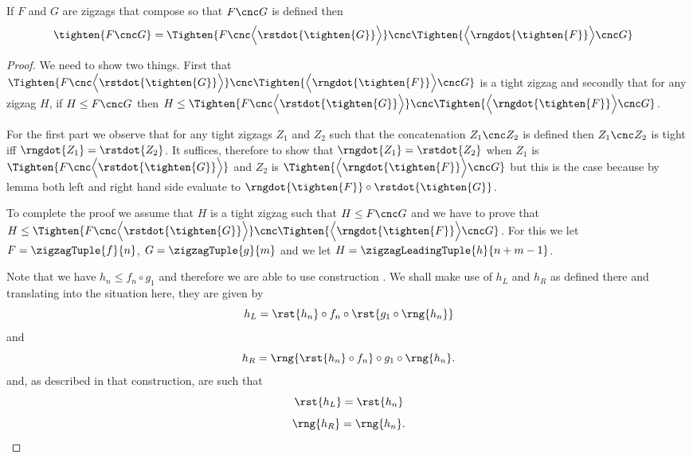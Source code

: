 {%
\newcommand{\tighteningLeft}{\Tighten{ F \cnc 
                               \Bigl\langle
                                  \rstdot{\tighten{G}}
                               \Bigr\rangle
                                      }
                            }

\newcommand {\tighteningRight}{\Tighten{ 
                                    \Bigl\langle
                                      \rngdot{\tighten{F}} 
                                    \Bigr\rangle
                                  \cnc G
                                        }
                              }
\newcommand {\theTightening}{\tighteningLeft \cnc \tighteningRight}


\begin{lemma}
If $F$ and $G$ are zigzags that compose so that
$F \cnc G$ is defined then
\begin{align*}
\tighten{F \cnc G} 
    &= \theTightening
\end{align*}
\end{lemma}
\begin{proof}
We need to show two things. First that  $\theTightening$
is a tight zigzag and secondly that for any 
zigzag $H$, if $H \leq F \cnc G$ then $H \leq \theTightening$.

For the first part we  observe that for any tight zigzags
$Z_1$ and $Z_2$ such that the concatenation $Z_1 \cnc Z_2$ is defined then $Z_1 \cnc Z_2$ is tight iff $\rngdot{Z_1} = \rstdot{Z_2}$. It suffices, therefore to show that $\rngdot{Z_1} = \rstdot{Z_2}$
when $Z_1$ is $\tighteningLeft$ and
$Z_2$ is $\tighteningRight$
but this is the case because by lemma  both left and right hand side evaluate  to 
$\rngdot{\tighten{F}} \circ \rstdot{\tighten{G}}$.

To complete the proof we assume that $H$ is a tight zigzag such that $H \leq F \cnc G$ and we have to prove that 
$H \leq \theTightening$. For this we let
$F=\zigzagTuple{f}{n}$, $G=\zigzagTuple{g}{m}$
and we let $H=\zigzagLeadingTuple{h}{n+m-1}$.

Note that we have $h_n \leq f_n \circ g_1$ and therefore
we are able to
use construction . 
We shall make use of $h_L$ and $h_R$ as defined there and translating into the situation here, they are given by
\[
h_L = \rst{h_n} \circ f_n \circ \rst{g_1 \circ \rng{h_n}}
\]
and  
\newcommand{\hR}{\rng{\rst{h_n} \circ f_n} \circ g_1 \circ \rng{h_n}}
\[
h_R = \hR.
\]
and, as described in that construction, are such that
\begin{equation}
\label{rstOfhL}
\rst{h_L}=\rst{h_n}
\end{equation}
\begin{equation}
\label{rngOfhR}
\rng{h_R}=\rng{h_n}.
\end{equation}


\end{proof}}

